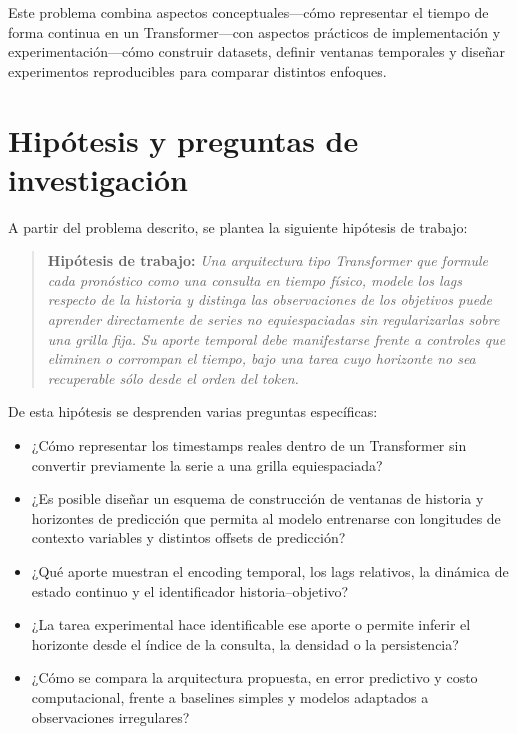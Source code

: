 Este problema combina aspectos conceptuales---cómo representar el tiempo de forma continua en un Transformer---con aspectos prácticos de implementación y experimentación---cómo construir datasets, definir ventanas temporales y diseñar experimentos reproducibles para comparar distintos enfoques.

\section{Hipótesis y preguntas de investigación}

A partir del problema descrito, se plantea la siguiente hipótesis de trabajo:

\begin{quote}
    \textbf{Hipótesis de trabajo:} \textit{Una arquitectura tipo Transformer que formule cada pronóstico como una consulta en tiempo físico, modele los lags respecto de la historia y distinga las observaciones de los objetivos puede aprender directamente de series no equiespaciadas sin regularizarlas sobre una grilla fija. Su aporte temporal debe manifestarse frente a controles que eliminen o corrompan el tiempo, bajo una tarea cuyo horizonte no sea recuperable sólo desde el orden del token.}
\end{quote}

De esta hipótesis se desprenden varias preguntas específicas:

\begin{itemize}
    \item ¿Cómo representar los timestamps reales dentro de un Transformer sin convertir previamente la serie a una grilla equiespaciada?
    \item ¿Es posible diseñar un esquema de construcción de ventanas de historia y horizontes de predicción que permita al modelo entrenarse con longitudes de contexto variables y distintos offsets de predicción?
    \item ¿Qué aporte muestran el encoding temporal, los lags relativos, la dinámica de estado continuo y el identificador historia--objetivo?
    \item ¿La tarea experimental hace identificable ese aporte o permite inferir el horizonte desde el índice de la consulta, la densidad o la persistencia?
    \item ¿Cómo se compara la arquitectura propuesta, en error predictivo y costo computacional, frente a baselines simples y modelos adaptados a observaciones irregulares?
\end{itemize}


